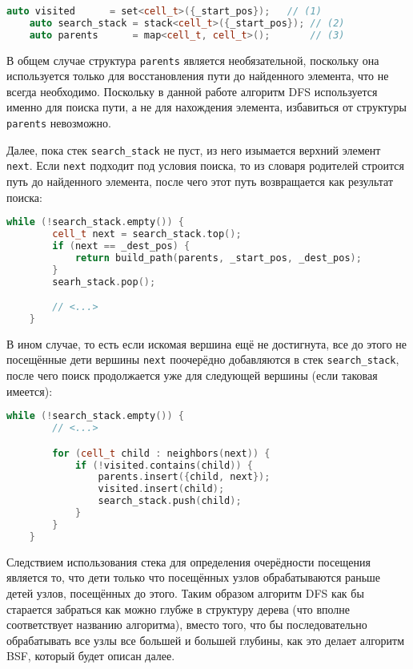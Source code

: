 \documentclass[a4paper, 12pt]{article}
\begin{document}
\begin{lstlisting}[language=C++]
    auto visited      = set<cell_t>({_start_pos});   // (1)
    auto search_stack = stack<cell_t>({_start_pos}); // (2)
    auto parents      = map<cell_t, cell_t>();       // (3)
\end{lstlisting}

В общем случае структура \verb|parents| является необязательной, поскольку она используется только для восстановления пути до найденного элемента, что не всегда необходимо. Поскольку в данной работе алгоритм DFS используется именно для поиска пути, а не для нахождения элемента, избавиться от структуры \verb|parents| невозможно.

Далее, пока стек \verb|search_stack| не пуст, из него изымается верхний элемент \verb|next|. Если \verb|next| подходит под условия поиска, то из словаря родителей строится путь до найденного элемента, после чего этот путь возвращается как результат поиска:

\begin{lstlisting}[language=C++]
    while (!search_stack.empty()) {
        cell_t next = search_stack.top();
        if (next == _dest_pos) {
            return build_path(parents, _start_pos, _dest_pos);
        }
        searh_stack.pop();

        // <...>
    }
\end{lstlisting}

В ином случае, то есть если искомая вершина ещё не достигнута, все до этого не посещённые дети вершины \verb|next| поочерёдно добавляются в стек \verb|search_stack|, после чего поиск продолжается уже для следующей вершины (если таковая имеется):

\begin{lstlisting}[language=C++]
    while (!search_stack.empty()) {
        // <...>

        for (cell_t child : neighbors(next)) {
            if (!visited.contains(child)) {
                parents.insert({child, next});
                visited.insert(child);
                search_stack.push(child);
            }
        }
    }
\end{lstlisting}

Следствием использования стека для определения очерёдности посещения является то, что дети только что посещённых узлов обрабатываются раньше детей узлов, посещённых до этого. Таким образом алгоритм DFS как бы старается забраться как можно глубже в структуру дерева (что вполне соответствует названию алгоритма), вместо того, что бы последовательно обрабатывать все узлы все большей и большей глубины, как это делает алгоритм BSF, который будет описан далее.
\end{document}

